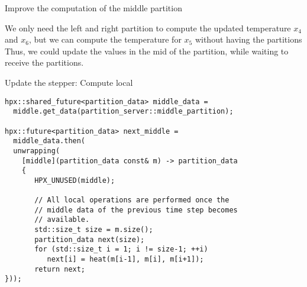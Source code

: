 \documentclass[\classoption]{beamer}
\begin{document}
\begin{frame}{Improve the computation of the middle partition}

\begin{center}
\end{center}

We only need the left and right partition to compute the updated temperature $x_4$ and $x_6$, but we can compute the temperature for $x_5$ without having the partitions Thus, we could update the values in the mid of the partition, while waiting to receive the partitions.

\end{frame}

\begin{frame}[fragile]{Update the stepper: Compute local}

\begin{lstlisting}
hpx::shared_future<partition_data> middle_data =
  middle.get_data(partition_server::middle_partition);
  
hpx::future<partition_data> next_middle = 
  middle_data.then(
  unwrapping(
    [middle](partition_data const& m) -> partition_data
    {
       HPX_UNUSED(middle);

       // All local operations are performed once the 
       // middle data of the previous time step becomes 
       // available.
       std::size_t size = m.size();
       partition_data next(size);
       for (std::size_t i = 1; i != size-1; ++i)
          next[i] = heat(m[i-1], m[i], m[i+1]);
       return next;
}));
\end{lstlisting}

\end{frame}
\end{document}
